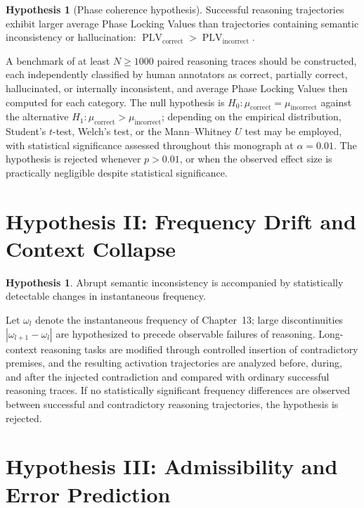 \documentclass[11pt,twoside,openright]{book}
\numberwithin{equation}{chapter}
\theoremstyle{definition}
\theoremstyle{plain}
\theoremstyle{remark}
\theoremstyle{definition}
\newtheorem{hypothesis}[definition]{Hypothesis}
\begin{document}
\begin{hypothesis}[Phase coherence hypothesis]
Successful reasoning trajectories exhibit larger average Phase Locking
Values than trajectories containing semantic inconsistency or
hallucination: $\operatorname{PLV}_{\mathrm{correct}}>\operatorname{PLV}_{\mathrm{incorrect}}$.
\end{hypothesis}

A benchmark of at least $N\ge1000$ paired reasoning traces should be
constructed, each independently classified by human annotators as
correct, partially correct, hallucinated, or internally inconsistent, and
average Phase Locking Values then computed for each category. The null
hypothesis is $H_0:\mu_{\mathrm{correct}}=\mu_{\mathrm{incorrect}}$
against the alternative
$H_1:\mu_{\mathrm{correct}}>\mu_{\mathrm{incorrect}}$; depending on the
empirical distribution, Student's $t$-test, Welch's test, or the
Mann--Whitney $U$ test may be employed, with statistical significance
assessed throughout this monograph at $\alpha=0.01$. The hypothesis is
rejected whenever $p>0.01$, or when the observed effect size is
practically negligible despite statistical significance.

\section{Hypothesis II: Frequency Drift and Context Collapse}

\begin{hypothesis}
Abrupt semantic inconsistency is accompanied by statistically detectable
changes in instantaneous frequency.
\end{hypothesis}

Let $\omega_l$ denote the instantaneous frequency of Chapter~13; large
discontinuities $|\omega_{l+1}-\omega_l|$ are hypothesized to precede
observable failures of reasoning. Long-context reasoning tasks are
modified through controlled insertion of contradictory premises, and the
resulting activation trajectories are analyzed before, during, and after
the injected contradiction and compared with ordinary successful
reasoning traces. If no statistically significant frequency differences
are observed between successful and contradictory reasoning trajectories,
the hypothesis is rejected.

\section{Hypothesis III: Admissibility and Error Prediction}
\end{document}
